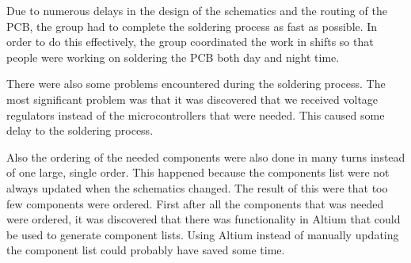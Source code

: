 Due to numerous delays in the design of the schematics and the routing of the PCB, the group had to complete the soldering process as fast as possible.
In order to do this effectively, the group coordinated the work in shifts so that people were working on soldering the PCB both day and night time.

There were also some problems encountered during the soldering process. The most significant problem was that it was discovered that
we received voltage regulators instead of the microcontrollers that were needed. This caused some delay to the soldering process.

Also the ordering of the needed components were also done in many turns instead of one large, single order.
This happened because the components list were not always updated when the schematics changed. The result of this were
that too few components were ordered. First after all the components that was needed were ordered, it was discovered that there was functionality in Altium that could be used
to generate component lists. Using Altium instead of manually updating the component list could probably have saved some time.

